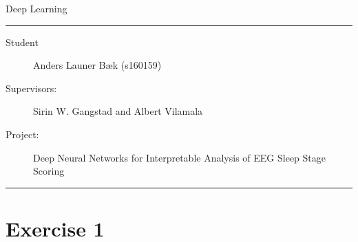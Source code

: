 \documentclass[11pt]{article}
\begin{document}
\begin{center}
{{\Large \sc Deep Learning}}
\end{center}
\rule{\textwidth}{1pt}
\begin{description}
\item[Student] Anders Launer Bæk (s160159)
\item[Supervisors:] Sirin W. Gangstad and Albert Vilamala
\item[Project:] Deep Neural Networks for Interpretable Analysis of EEG Sleep Stage Scoring
\end{description}
\rule{\textwidth}{1pt}


\section*{Exercise 1}
\end{document}
